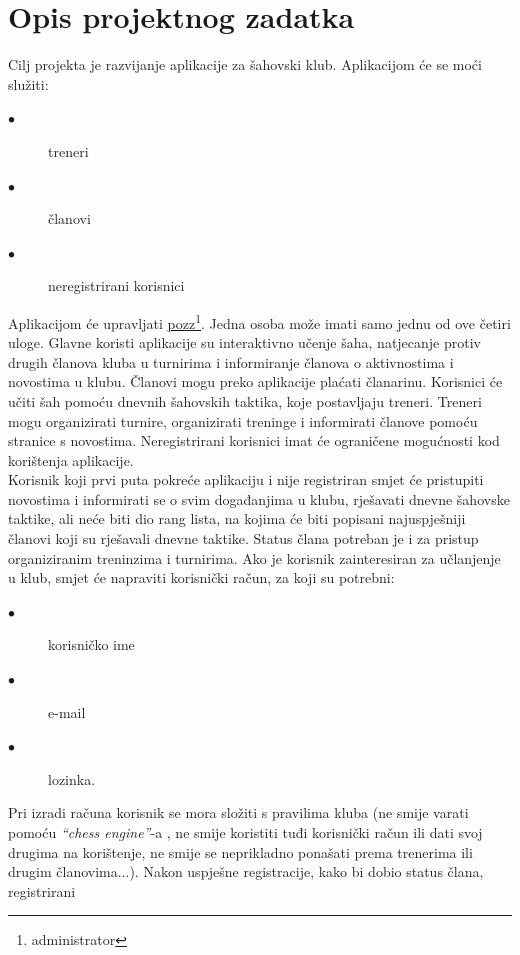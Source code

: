 \chapter{Opis projektnog zadatka}
		
		 \noindent   Cilj projekta je razvijanje aplikacije za šahovski klub. Aplikacijom će
			se moći služiti:
			
			\begin{description}
				\item[$\bullet$] treneri 
				\item[$\bullet$] članovi
				\item[$\bullet$] neregistrirani korisnici
			\end{description} 
		    Aplikacijom će upravljati \underline{pozz}\footnote{administrator}. Jedna osoba može imati samo jednu od ove
			četiri uloge. Glavne koristi aplikacije su interaktivno učenje šaha,
			natjecanje protiv drugih članova kluba u turnirima i informiranje članova
			o aktivnostima i novostima u klubu. Članovi mogu preko aplikacije plaćati članarinu. Korisnici će učiti šah pomoću dnevnih šahovskih
			taktika, koje postavljaju treneri. Treneri mogu organizirati turnire,
			organizirati treninge i informirati članove pomoću stranice s novostima.
			Neregistrirani korisnici imat će ograničene mogućnosti kod korištenja
			aplikacije. \\
		    Korisnik koji prvi puta pokreće aplikaciju i nije registriran smjet će
			pristupiti novostima i informirati se o svim događanjima u klubu,
			rješavati dnevne šahovske taktike, ali neće biti dio rang lista, na
			kojima će biti popisani najuspješniji članovi koji su rješavali dnevne
			taktike. Status člana potreban je i za pristup organiziranim treninzima
			i turnirima. Ako je korisnik zainteresiran za učlanjenje u klub,
			smjet će napraviti korisnički račun, za koji su potrebni:
			\begin{description}
			\item[$\bullet$] korisničko ime
			\item[$\bullet$] e-mail
			\item[$\bullet$] lozinka. 
	    	\end{description} 
			Pri izradi računa korisnik se mora složiti s
			pravilima kluba (ne smije varati pomoću \textit{``chess engine''}-a , ne smije
			koristiti tuđi korisnički račun ili dati svoj drugima na korištenje, ne
			smije se neprikladno ponašati prema trenerima ili drugim članovima...).
			Nakon uspješne registracije, kako bi dobio status člana, registrirani
